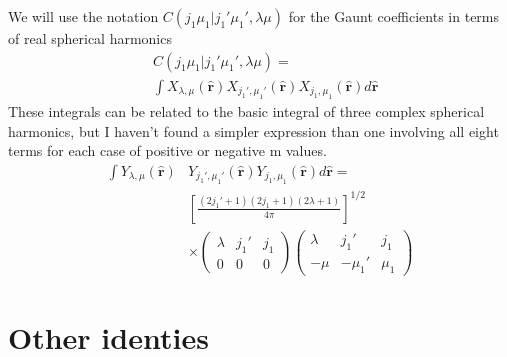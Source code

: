 \documentclass[%
pra%
,twocolumn%
,amssymb, nobibnotes, aps,
longbibliography
]{revtex4-1}
\begin{document}
We will use the notation
$C(j_1\mu_1|j_1'\mu_1',\lambda \mu)$ for the Gaunt coefficients 
in terms of real spherical harmonics
\begin{equation}
\begin{split}
& C(j_1\mu_1|j_1'\mu_1',\lambda \mu) = \\
& \int 
X_{\lambda,\mu} (\mathbf{\hat{r}})
X_{j_1',\mu_1'} (\mathbf{\hat{r}}) X_{j_1,\mu_1} (\mathbf{\hat{r}})
d\mathbf{\hat{r}}  
\end{split}
\end{equation}
These integrals can be related to the basic integral of three complex spherical
harmonics, but I haven't found a simpler expression than one involving all eight terms
for each case of positive or negative m values.
\begin{equation}
\begin{split}
 \int 
Y_{\lambda,\mu} (\mathbf{\hat{r}})&
Y_{j_1',\mu_1'} (\mathbf{\hat{r}})
Y_{j_1,\mu_1} (\mathbf{\hat{r}})
d\mathbf{\hat{r}}  = \\
&
\left[\frac{(2j_1' + 1)(2j_1+1)(2\lambda+1)}{4\pi}\right]^{1/2} \\
& \times 
\begin{pmatrix}
\lambda&j_1'&j_1\\
0&0&0
\end{pmatrix}
\begin{pmatrix}
\lambda&j_1'&j_1\\
-\mu&-\mu_1'&\mu_1
\end{pmatrix}
\end{split}
\end{equation}


\section{Other identies}

%
\end{document}
